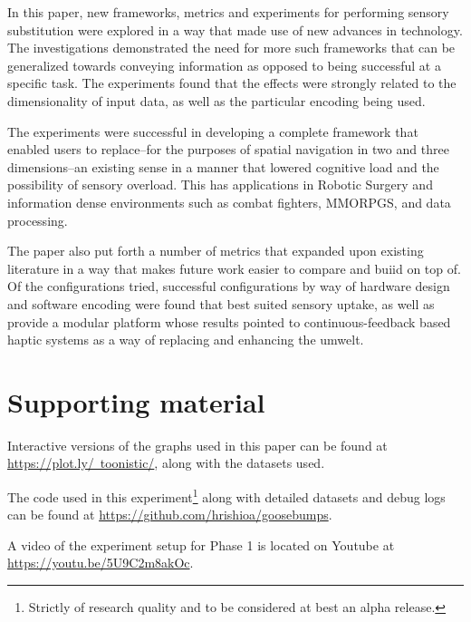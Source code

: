 \documentclass[
12pt, %
oneside, %
english, %
doublespacing, %
headsepline, %
]{MastersDoctoralThesis} %
\begin{document}
In this paper, new frameworks, metrics and experiments for performing sensory substitution were explored in a way that made use of new advances in technology. The investigations demonstrated the need for more such frameworks that can be generalized towards conveying information as opposed to being successful at a specific task. The experiments found that the effects were strongly related to the dimensionality of input data, as well as the particular encoding being used.

The experiments were successful in developing a complete framework that enabled users to replace--for the purposes of spatial navigation in two and three dimensions--an existing sense in a manner that lowered cognitive load and the possibility of sensory overload. This has applications in Robotic Surgery and information dense environments such as combat fighters, MMORPGS, and data processing.

The paper also put forth a number of metrics that expanded upon existing literature in a way that makes future work easier to compare and buiid on top of. Of the configurations tried, successful configurations by way of hardware design and software encoding were found that best suited sensory uptake, as well as provide a modular platform whose results pointed to continuous-feedback based haptic systems as a way of replacing and enhancing the umwelt.


\appendix %

\chapter{Supporting material}

Interactive versions of the graphs used in this paper can be found at \href{https://plot.ly/~toonistic/}{https://plot.ly/~toonistic/}, along with the datasets used.

The code used in this experiment\footnote{Strictly of research quality and to be considered at best an alpha release.} along with detailed datasets and debug logs can be found at \href{https://github.com/hrishioa/goosebumps}{https://github.com/hrishioa/goosebumps}.

A video of the experiment setup for Phase 1 is located on Youtube at \href{https://youtu.be/5U9C2m8akOc}{https://youtu.be/5U9C2m8akOc}.
\end{document}

